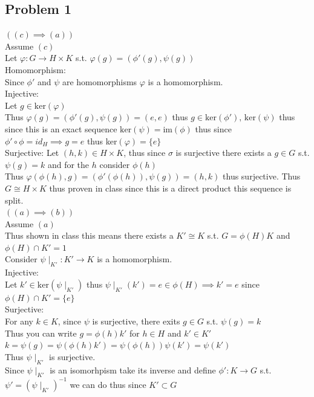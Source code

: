 \documentclass[12pt, letterpaper]{article}
\theoremstyle{definition}
\renewcommand{\t}[1]{\text{#1}}
\begin{document}
\pagestyle{fancy}
\fancyhf{}
\fancyhead[ROE]{\thepage}

\subsection*{Problem 1}
$((c)\implies (a))$\\
Assume $(c)$\\
Let $\varphi: G \rightarrow H \times K$ s.t. $\varphi(g)=(\phi'(g),\psi(g))$\\
Homomorphism:\\
Since $\phi'$ and $\psi$ are homomorphisms $\varphi$ is a homomorphism.\\
Injective:\\
Let $g \in \t{ker}(\varphi)$\\
Thus $\varphi(g)=(\phi'(g),\psi(g))=(e,e)$ thus $g \in \t{ker}(\phi'),\,\t{ker}(\psi)$ 
thus since this is an exact sequence $\t{ker}(\psi)=\t{im}(\phi)$ thus since $\phi'\circ \phi=id_H \implies g=e$ thus ker$(\varphi)=\{e\}$\\
Surjective:
Let $(h,k) \in H \times K$, thus since $\sigma$ is surjective there exists a $g \in G$ s.t. $\psi(g)=k$ and for the $h$ consider $\phi(h)$\\
Thus $\varphi(\phi(h),g)=(\phi'(\phi(h)),\psi(g))=(h,k)$ thus surjective. Thus $G \cong H \times K$ thus proven in class since this is a direct product this sequence is split.\\
$((a)\implies (b))$\\
Assume $(a)$\\
Thus shown in class this means there exists a $K' \cong K$ s.t. $G=\phi(H)K$ and $\phi(H) \cap K'=1$\\
Consider $\psi\mid_{K'}: K' \rightarrow K$ is a homomorphism.\\
Injective:\\
Let $k' \in \t{ker}(\psi\mid_{K'})$ thus $\psi\mid_{K'}(k')=e \in \phi(H) \implies k'=e$ since $\phi(H) \cap K' = \{e\}$\\
Surjective:\\
For any $k \in K$, since $\psi$ is surjective, there exits $g \in G$ s.t. $\psi(g)=k$\\
Thus you can write $g=\phi(h)k'$ for $h \in H$ and $k' \in K'$\\
$k=\psi(g)=\psi(\phi(h)k')=\psi(\phi(h))\psi(k')=\psi(k')$\\
Thus $\psi\mid_{K'}$ is surjective.\\
Since $\psi\mid_{K'}$ is an isomorhpism take its inverse and define $\phi': K \rightarrow G$ s.t. $\psi'=(\psi\mid_{K'})^{-1}$ we can do thus since $K' \subset G$\\
\end{document}
